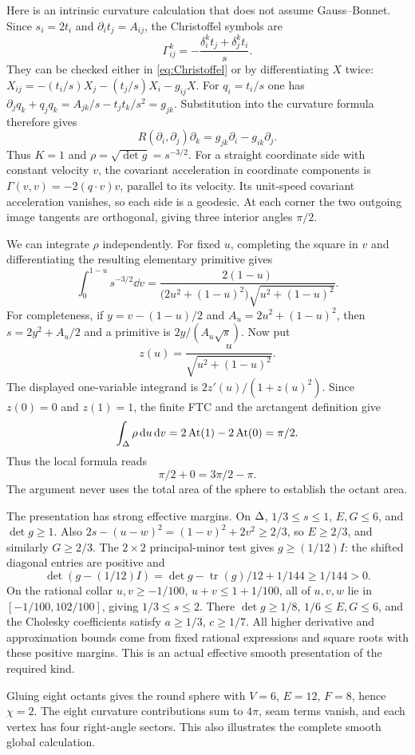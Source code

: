 Here is an intrinsic curvature calculation that does not assume Gauss--Bonnet. Since $s_i=2t_i$ and $\partial_i t_j=A_{ij}$, the Christoffel symbols are
\[
\Gamma^k_{ij}=-\frac{\delta_i^kt_j+\delta_j^kt_i}{s}.
\]
They can be checked either in \eqref{eq:Christoffel} or by differentiating $X$ twice:
$X_{ij}=-(t_i/s)X_j-(t_j/s)X_i-g_{ij}X$.
For $q_i=t_i/s$ one has
$\partial_jq_k+q_jq_k=A_{jk}/s-t_jt_k/s^2=g_{jk}$.
Substitution into the curvature formula therefore gives
\[
R(\partial_i,\partial_j)\partial_k
=g_{jk}\partial_i-g_{ik}\partial_j.
\]
Thus $K=1$ and $\rho=\sqrt{\det g}=s^{-3/2}$. For a straight coordinate side with constant velocity $v$, the covariant acceleration in coordinate components is
$\Gamma(v,v)=-2(q\cdot v)v$, parallel to its velocity. Its unit-speed covariant acceleration vanishes, so each side is a geodesic. At each corner the two outgoing image tangents are orthogonal, giving three interior angles $\pi/2$.

We can integrate $\rho$ independently. For fixed $u$, completing the square in $v$ and differentiating the resulting elementary primitive gives
\[
\int_0^{1-u}s^{-3/2}\dd v
=\frac{2(1-u)}{\bigl(2u^2+(1-u)^2\bigr)\sqrt{u^2+(1-u)^2}}.
\]
For completeness, if $y=v-(1-u)/2$ and $A_u=2u^2+(1-u)^2$, then
$s=2y^2+A_u/2$ and a primitive is $2y/(A_u\sqrt s)$.
Now put
\[
z(u)=\frac{u}{\sqrt{u^2+(1-u)^2}}.
\]
The displayed one-variable integrand is $2z'(u)/(1+z(u)^2)$. Since $z(0)=0$ and $z(1)=1$, the finite FTC and the arctangent definition give
\[
\int_\Delta\rho\,\mathrm d u\,\mathrm d v=2\operatorname{At}(1)-2\operatorname{At}(0)=\pi/2.
\]
Thus the local formula reads
\[
\pi/2+0=3\pi/2-\pi.
\]
The argument never uses the total area of the sphere to establish the octant area.

The presentation has strong effective margins. On $\Delta$, $1/3\le s\le1$, $E,G\le6$, and $\det g\ge1$. Also
$2s-(u-w)^2=(1-v)^2+2v^2\ge2/3$, so $E\ge2/3$, and similarly $G\ge2/3$. The $2\times2$ principal-minor test gives $g\ge(1/12)I$: the shifted diagonal entries are positive and
\[
\det(g-(1/12)I)=\det g-\operatorname{tr}(g)/12+1/144\ge1/144>0.
\]
On the rational collar $u,v\ge-1/100$, $u+v\le1+1/100$, all of $u,v,w$ lie in $[-1/100,102/100]$, giving $1/3\le s\le2$. There $\det g\ge1/8$, $1/6\le E,G\le6$, and the Cholesky coefficients satisfy $a\ge1/3$, $c\ge1/7$. All higher derivative and approximation bounds come from fixed rational expressions and square roots with these positive margins. This is an actual effective smooth presentation of the required kind.

Gluing eight octants gives the round sphere with $V=6$, $E=12$, $F=8$, hence $\chi=2$. The eight curvature contributions sum to $4\pi$, seam terms vanish, and each vertex has four right-angle sectors. This also illustrates the complete smooth global calculation.


